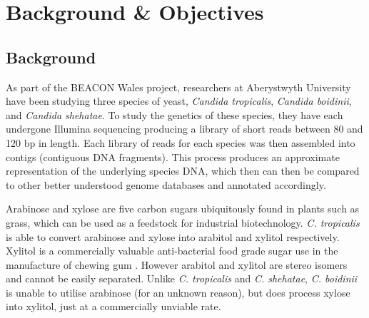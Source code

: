\chapter{Background \& Objectives}

% 
% 
%    
%    

\section{Background}
As part of the BEACON Wales\cite{beacon} project, researchers at Aberystwyth University have been studying three species of yeast, \textit{Candida tropicalis}, \textit{Candida boidinii}, and \textit{Candida shehatae}. To study the genetics of these species, they have each undergone Illumina sequencing producing a library of short reads between 80 and 120 bp in length. Each library of reads for each species was then assembled into contigs (contiguous DNA fragments). This process produces an approximate representation of the underlying species DNA, which then can then be compared to other better understood genome databases and annotated accordingly.

Arabinose and xylose are five carbon sugars ubiquitously found in plants such as grass, which can be used as a feedstock for industrial biotechnology. \textit{C. tropicalis} is able to convert arabinose and xylose into arabitol and xylitol respectively. Xylitol is a commercially valuable anti-bacterial food grade sugar use in the manufacture of chewing gum \cite{xylitol}. However arabitol and xylitol are stereo isomers and cannot be easily separated. Unlike \textit{C. tropicalis} and \textit{C. shehatae},  \textit{C. boidinii} is unable to utilise arabinose (for an unknown reason), but does process xylose into xylitol, just at a commercially unviable rate. 

